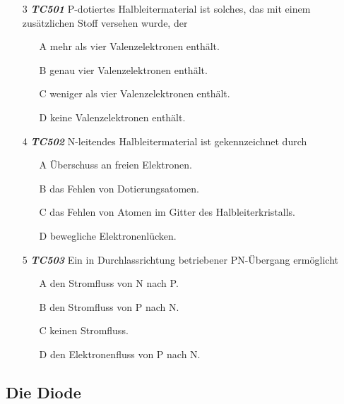 \begin{enumerate}
\item[3] \emph{\textbf{TC501}}    P-dotiertes Halbleitermaterial ist solches, das mit einem zusätzlichen Stoff versehen wurde, der
	\begin{enumerate}
	\itemsep1pt\parskip0pt
		\item[A] mehr als vier Valenzelektronen enthält.
		\item[B] genau vier Valenzelektronen enthält.
		\item[C] weniger als vier Valenzelektronen enthält.
		\item[D] keine Valenzelektronen enthält.
	\end{enumerate}
\end{enumerate}


\begin{enumerate}
\item[4] \emph{\textbf{TC502}}   N-leitendes Halbleitermaterial ist gekennzeichnet durch
	\begin{enumerate}
	\itemsep1pt\parskip0pt
		\item[A] Überschuss an freien Elektronen.
		\item[B] das Fehlen von Dotierungsatomen.
		\item[C] das Fehlen von Atomen im Gitter des Halbleiterkristalls.
		\item[D] bewegliche Elektronenlücken.
	\end{enumerate}
\end{enumerate}


\begin{enumerate}
\item[5] \emph{\textbf{TC503}}  Ein in Durchlassrichtung betriebener PN-Übergang ermöglicht
	\begin{enumerate}
	\itemsep1pt\parskip0pt
		\item[A] den Stromfluss von N nach P.
		\item[B] den Stromfluss von P nach N.
		\item[C] keinen Stromfluss.
		\item[D] den Elektronenfluss von P nach N.
	\end{enumerate}
\end{enumerate}


\subsection*{Die Diode}

